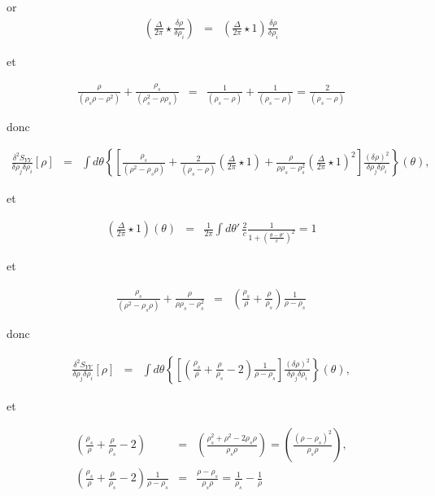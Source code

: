 	or 
	\begin{eqnarray}
		\left (  \frac{\Delta}{2\pi} \star\frac{\delta \rho}{\delta \rho_i} \right ) & = & \left (  \frac{\Delta}{2\pi} \star 1  \right )	\frac{\delta \rho}{\delta \rho_i} 
	\end{eqnarray}
	
	et 
	
	\begin{eqnarray}
		\frac{\rho }{(\rho_s\rho -\rho^2) } + \frac{\rho_s }{( \rho_s^2 - \rho \rho_s) } & = & 	\frac{1}{(\rho_s -\rho) } + 	\frac{1}{( \rho_s - \rho ) } = \frac{2}{( \rho_s - \rho ) }
	\end{eqnarray}
	
	donc 
	
	\begin{eqnarray}
		\frac{ \delta^2 S_{YY} }{ \delta \rho_j\delta \rho_i } [\rho ] & = & 	\int  d\theta\left \{  \left [  \frac{\rho_s}{(\rho^2  - \rho_s\rho)}  +  \frac{2}{( \rho_s - \rho ) } \left (  \frac{\Delta}{2\pi} \star 1    \right )  +  \frac{\rho }{\rho\rho_s - \rho_s^2 }\left (  \frac{\Delta}{2\pi} \star 1 \right )^2  \right ]   \frac{(\delta \rho)^2}{\delta \rho_j \delta \rho_i} \right \}(\theta),
	\end{eqnarray}
	
	et 
	
	\begin{eqnarray}
		\left ( \frac{\Delta}{2\pi} \star 1 \right ) (\theta ) & = & \frac{1}{2\pi} \int d \theta' \, \frac{2}{c} \frac{ 1 }{1 +\left (  \frac{ \theta - \theta'}{c}  \right )^2 } =1 
	\end{eqnarray}

	et 
	
	\begin{eqnarray}
		\frac{\rho_s}{(\rho^2  - \rho_s\rho)}  + 	\frac{\rho }{\rho\rho_s - \rho_s^2 } & = & \left ( \frac{\rho_s}{\rho} +  \frac{\rho}{\rho_s }\right ) 	\frac{1 }{\rho - \rho_s }
	\end{eqnarray}
	
	donc
	
	\begin{eqnarray}
		\frac{ \delta^2 S_{YY} }{ \delta \rho_j\delta \rho_i } [\rho ] & = & 	\int  d\theta\left \{  \left [  \left ( \frac{\rho_s}{\rho} +  \frac{\rho}{\rho_s } - 2 \right ) \frac{1 }{\rho - \rho_s  } \right ]   \frac{(\delta \rho)^2}{\delta \rho_j \delta \rho_i} \right \}(\theta),
	\end{eqnarray} 
	
	et 
	
	\begin{eqnarray}
		\left ( \frac{\rho_s}{\rho} +  \frac{\rho}{\rho_s } - 2 \right )  & = & 	\left ( \frac{\rho_s^2 + \rho^2  - 2\rho_s \rho }{\rho_s \rho} \right ) =  \left ( \frac{ (\rho - \rho_s )^2  }{\rho_s \rho} \right ),\\
		\left ( \frac{\rho_s}{\rho} +  \frac{\rho}{\rho_s } - 2 \right ) \frac{1 }{\rho - \rho_s   } & = &  \frac{ \rho - \rho_s}{\rho_s\rho} = \frac{1}{\rho_s} - \frac{1}{\rho}  		
	\end{eqnarray}
	
